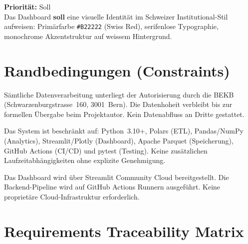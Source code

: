 \documentclass[12pt, a4paper, oneside]{report}
\newcommand{\code}[1]{\texttt{\small\textcolor{darknavy}{#1}}}
\begin{document}
\begin{reqbox}
\textbf{Priorit\"at:} Soll \\
Das Dashboard \textbf{soll} eine visuelle Identit\"at im Schweizer Institutional-Stil aufweisen: Prim\"arfarbe \code{\#B22222} (Swiss Red), serifenlose Typographie, monochrome Akzentstruktur auf weissem Hintergrund.
\end{reqbox}

\section{Randbedingungen (Constraints)}

\begin{warnbox}
S\"amtliche Datenverarbeitung unterliegt der Autorisierung durch die BEKB (Schwarzenburgstrasse~160, 3001~Bern). Die Datenhoheit verbleibt bis zur formellen \"Ubergabe beim Projektautor. Kein Datenabfluss an Dritte gestattet.
\end{warnbox}

\vspace{6pt}

\begin{warnbox}
Das System ist beschr\"ankt auf: Python~3.10+, Polars (ETL), Pandas/NumPy (Analytics), Streamlit/Plotly (Dashboard), Apache Parquet (Speicherung), GitHub Actions (CI/CD) und pytest (Testing). Keine zus\"atzlichen Laufzeitabh\"angigkeiten ohne explizite Genehmigung.
\end{warnbox}

\vspace{6pt}

\begin{warnbox}
Das Dashboard wird \"uber Streamlit Community Cloud bereitgestellt. Die Backend-Pipeline wird auf GitHub Actions Runnern ausgef\"uhrt. Keine propriet\"are Cloud-Infrastruktur erforderlich.
\end{warnbox}

\section{Requirements Traceability Matrix}
\end{document}
